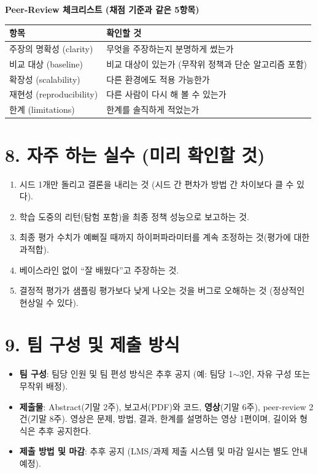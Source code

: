 \documentclass[12pt]{article}
\begin{document}
\vspace{4pt}
\noindent\textbf{Peer-Review 체크리스트 (채점 기준과 같은 5항목)}
\begin{center}
\small
\begin{tabular}{@{}ll@{}}
\toprule
항목 & 확인할 것 \\
\midrule
주장의 명확성 (clarity) & 무엇을 주장하는지 분명하게 썼는가 \\
비교 대상 (baseline) & 비교 대상이 있는가 (무작위 정책과 단순 알고리즘 포함) \\
확장성 (scalability) & 다른 환경에도 적용 가능한가 \\
재현성 (reproducibility) & 다른 사람이 다시 해 볼 수 있는가 \\
한계 (limitations) & 한계를 솔직하게 적었는가 \\
\bottomrule
\end{tabular}
\end{center}

\section*{8. 자주 하는 실수 (미리 확인할 것)}
\begin{enumerate}
\item 시드 1개만 돌리고 결론을 내리는 것 (시드 간 편차가 방법 간
  차이보다 클 수 있다).
\item 학습 도중의 리턴(탐험 포함)을 최종 정책 성능으로 보고하는 것.
\item 최종 평가 수치가 예뻐질 때까지 하이퍼파라미터를 계속 조정하는
  것(평가에 대한 과적합).
\item 베이스라인 없이 ``잘 배웠다''고 주장하는 것.
\item 결정적 평가가 샘플링 평가보다 낮게 나오는 것을 버그로 오해하는
  것 (정상적인 현상일 수 있다).
\end{enumerate}

\section*{9. 팀 구성 및 제출 방식}
\begin{itemize}
\item \textbf{팀 구성}: 팀당 인원 및 팀 편성 방식은 추후 공지 (예:
  팀당 1$\sim$3인, 자유 구성 또는 무작위 배정).
\item \textbf{제출물}: Abstract(기말 2주), 보고서(PDF)와 코드, \textbf{영상}(기말 6주), peer-review 2건(기말 8주). 영상은 문제, 방법, 결과, 한계를 설명하는 영상 1편이며, 길이와 형식은 추후 공지한다.
\item \textbf{제출 방법 및 마감}: 추후 공지 (LMS/과제 제출 시스템 및
  마감 일시는 별도 안내 예정).
\end{itemize}
\end{document}
